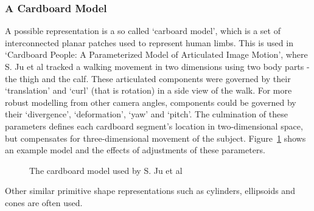 \subsubsection{A Cardboard Model}

A possible representation is a so called `carboard model', which is a set of interconnected planar patches used to represent human limbs. This is used in `Cardboard People: A Parameterized Model of Articulated Image Motion'\cite{cardboardpeople}, where S. Ju et al tracked a walking movement in two dimensions using two body parts - the thigh and the calf. These articulated components were governed by their `translation' and `curl' (that is rotation) in a side view of the walk. For more robust modelling from other camera angles, components could be governed by their `divergence', `deformation', `yaw' and `pitch'. The culmination of these parameters defines each cardboard segment's location in two-dimensional space, but compensates for three-dimensional movement of the subject. Figure~\ref{fig:cardboardmodel} shows an example model and the effects of adjustments of these parameters.

\begin{figure}[H]
    \centering
\caption{The cardboard model used by S. Ju et al\cite{cardboardpeople}}
\label{fig:cardboardmodel}
\end{figure}

Other similar primitive shape representations such as cylinders, ellipsoids and cones are often used\cite{cvmocapsurvey}.
